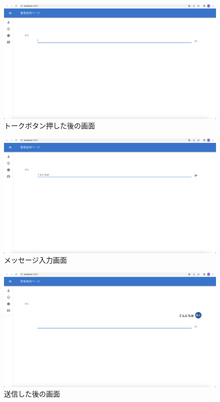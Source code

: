   \begin{figure}[!h]
    \begin{center}
      \includegraphics[scale=0.3, clip]{./img/chat2.png}
      \caption{トークボタン押した後の画面}
      \label{fig:図の名前}
    \end{center}
    \end{figure}

    \begin{figure}[!h]
      \begin{center}
        \includegraphics[scale=0.3, clip]{./img/chat3.png}
        \caption{メッセージ入力画面}
        \label{fig:図の名前}
      \end{center}
      \end{figure}

      \begin{figure}[!h]
        \begin{center}
          \includegraphics[scale=0.3, clip]{./img/chat4.png}
          \caption{送信した後の画面}
          \label{fig:図の名前}
        \end{center}
        \end{figure}

